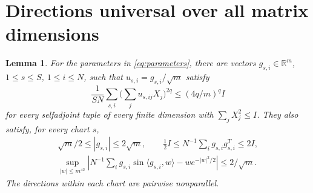 \documentclass[11pt]{article}
\newtheorem{lemma}[theorem]{Lemma}
\theoremstyle{remark}\newtheorem{remark}[theorem]{Remark}
\numberwithin{equation}{section}
\newcommand{\R}{\mathbb R}\newcommand{\C}{\mathbb C}
\newcommand{\ip}[2]{\langle #1,#2\rangle}
\begin{document}
\section{Directions universal over all matrix dimensions}\label{sec:design}
\begin{lemma}\label{lem:design}
For the parameters in \eqref{eq:parameters}, there are vectors
$g_{s,i}\in\R^m$, $1\le s\le S$, $1\le i\le N$, such that
$u_{s,i}=g_{s,i}/\sqrt m$ satisfy
\begin{equation}\label{eq:moment}
 \frac1{SN}\sum_{s,i}\Big(\sum_j u_{s,ij}X_j\Big)^{2q}
 \le (4q/m)^q I
\end{equation}
for every selfadjoint tuple of every finite dimension with
$\sum_jX_j^2\le I$. They also satisfy, for every chart $s$,
\begin{gather}
 \sqrt m/2\le |g_{s,i}|\le2\sqrt m,\qquad
 \tfrac12 I\le N^{-1}\sum_i g_{s,i}g_{s,i}^{T}\le2I,\label{eq:dirnorm}\\
 \sup_{|w|\le m^{42}}\left|
   N^{-1}\sum_i g_{s,i}\sin\ip{g_{s,i}}w-we^{-|w|^2/2}\right|
 \le 2/\sqrt m.\label{eq:fourier}
\end{gather}
The directions within each chart are pairwise nonparallel.
\end{lemma}
\end{document}
